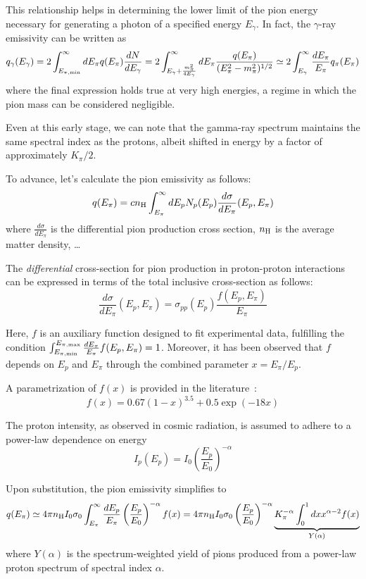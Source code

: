 This relationship helps in determining the lower limit of the pion energy necessary for generating a photon of a specified energy \( E_\gamma \). In fact, the $\gamma$-ray emissivity can be written as
%
\[
q_\gamma(E_\gamma) = 2 \int_{E_{\rm \pi, min}}^\infty dE_\pi q(E_\pi) \frac{dN}{dE_\gamma} = 
2 \int_{E_\gamma + \frac{m_\pi^2}{4 E_\gamma}}^\infty dE_\pi \frac{q(E_\pi)}{(E_\pi^2 - m_\pi^2)^{1/2}} \simeq 2 \int_{E_\gamma}^\infty \frac{dE_\pi}{E_\pi} q_\pi(E_\pi)
\]
%
where the final expression holds true at very high energies, a regime in which the pion mass can be considered negligible.

Even at this early stage, we can note that the gamma-ray spectrum maintains the same spectral index as the protons, albeit shifted in energy by a factor of approximately \( K_\pi / 2 \).

To advance, let's calculate the pion emissivity as follows:
%
\[
q(E_\pi) = c n_{\rm H} \int_{E_\pi}^\infty dE_p N_p (E_p) \frac{d\sigma}{dE_\pi}(E_p, E_\pi)
\]
%
where $\frac{d\sigma}{dE_\pi}$ is the differential pion production cross section, $n_{\rm H}$ is the average matter density, \dots

The \emph{differential} cross-section for pion production in proton-proton interactions can be expressed in terms of the total inclusive cross-section as follows:
%
\[
\frac{d\sigma}{dE_\pi}(E_p, E_\pi) = \sigma_{pp}(E_p) \frac{f(E_p, E_\pi)}{E_\pi}
\]

Here, \(f\) is an auxiliary function designed to fit experimental data, fulfilling the condition $\int_{E_{\rm \pi,min}}^{E_{\rm \pi,max}} \frac{dE_\pi}{E_\pi} f(E_p, E_\pi) = 1$. 
%
Moreover, it has been observed that $f$ depends on \(E_p\) and \(E_\pi\) through the combined parameter \(x = E_\pi / E_p\). 

A parametrization of \(f(x)\) is provided in the literature~\cite{Cavasinni2006aph}:
%
\[
f(x) = 0.67 (1-x)^{3.5} + 0.5 \exp(-18 x)
\]

The proton intensity, as observed in cosmic radiation, is assumed to adhere to a power-law dependence on energy
%
\[
I_p(E_p) = I_0 \left(\frac{E_p}{E_0}\right)^{-\alpha}
\]

Upon substitution, the pion emissivity simplifies to
%
 \[
q(E_\pi) \simeq 4 \pi n_{\rm H} I_0 \sigma_0 \int_{E_\pi}^\infty \frac{dE_p}{E_\pi} \left(\frac{E_p}{E_0} \right)^{-\alpha} f(x) = 4 \pi n_{\rm H} I_0 \sigma_0 \left(\frac{E_p}{E_0} \right)^{-\alpha} \underbrace{K_\pi^{-\alpha} \int_0^1 dx x^{\alpha-2} f(x)}_{Y(\alpha)}
\]
%
where $Y(\alpha)$ is the spectrum-weighted yield of pions produced from a power-law proton spectrum of spectral index $\alpha$.

